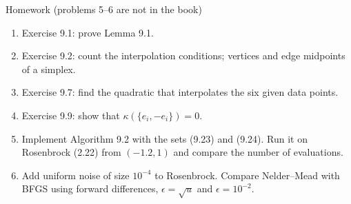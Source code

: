 \documentclass[12pt,aspectratio=169]{beamer}
\newcommand{\eps}{\epsilon}
\begin{document}
\begin{frame}{Homework {\normalsize (problems 5--6 are not in the book)}}
  \begin{enumerate}
    \item Exercise 9.1: prove Lemma 9.1.
    \item Exercise 9.2: count the interpolation conditions; vertices and edge midpoints of a simplex.
    \item Exercise 9.7: find the quadratic that interpolates the six given data points.
    \item Exercise 9.9: show that $\kappa(\{e_i,-e_i\})=0$.
    \item Implement Algorithm 9.2 with the sets (9.23) and (9.24). Run it on Rosenbrock (2.22) from $(-1.2,1)$
      and compare the number of evaluations.
    \item Add uniform noise of size $10^{-4}$ to Rosenbrock. Compare Nelder--Mead with BFGS using forward differences,
      $\eps=\sqrt u$ and $\eps=10^{-2}$.
  \end{enumerate}
\end{frame}
\end{document}
